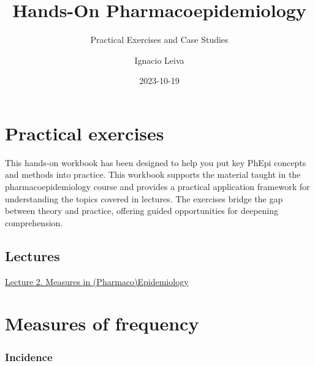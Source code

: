 \documentclass[
  14pt,
  letterpaper,
  DIV=11,
  numbers=noendperiod]{scrreprt}
\title{Hands-On Pharmacoepidemiology}
\subtitle{Practical Exercises and Case Studies}
\author{Ignacio Leiva}
\date{2023-10-19}
\renewcommand*\contentsname{Table of contents}
\newcommand\contentsname{Table of contents}
\begin{document}
\maketitle


\renewcommand*\contentsname{Table of contents}
{
\hypersetup{linkcolor=}
\setcounter{tocdepth}{2}
\tableofcontents
}


\chapter*{Practical exercises}\label{practical-exercises}


This hands-on workbook has been designed to help you put key PhEpi
concepts and methods into practice. This workbook supports the material
taught in the pharmacoepidemiology course and provides a practical
application framework for understanding the topics covered in lectures.
The exercises bridge the gap between theory and practice, offering
guided opportunities for deepening comprehension.

\section*{Lectures}\label{lectures}


\href{https://ignaleiva.github.io/Lecture2-Frequency-Effect/\#/section}{Lecture
2. Measures in (Pharmaco)Epidemiology}


\chapter{Measures of frequency}\label{sec-measure-of-frequency}

\subsection{Incidence}\label{incidence}
\end{document}

